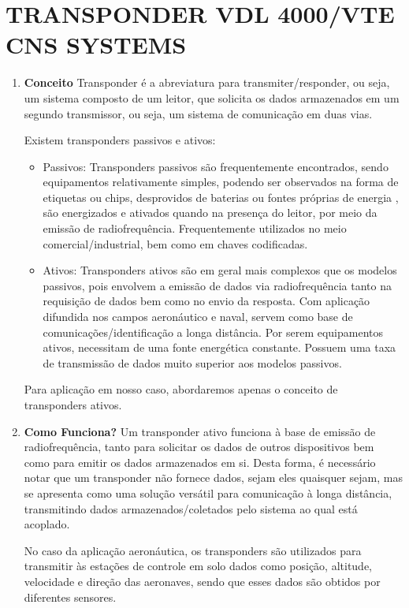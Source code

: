 \chapter[TRANSPONDER VDL 4000/VTE CNS SYSTEMS]{TRANSPONDER VDL 4000/VTE CNS SYSTEMS}

\begin{enumerate}
\item \textbf{Conceito}
Transponder é a abreviatura para transmiter/responder, ou seja, um sistema
composto de um leitor, que solicita os dados armazenados em um segundo
transmissor, ou seja, um sistema de comunicação em duas vias.

Existem transponders passivos e ativos:

\begin{itemize}
  \item Passivos: Transponders passivos são frequentemente encontrados,
  sendo equipamentos relativamente simples, podendo ser observados na forma
  de etiquetas ou chips, desprovidos de baterias ou fontes próprias de energia
  , são energizados e ativados quando na presença do leitor, por meio da
   emissão de radiofrequência. Frequentemente utilizados no meio
   comercial/industrial, bem como em chaves codificadas.
  \item Ativos: Transponders ativos são em geral mais complexos que os
  modelos passivos, pois envolvem a emissão de dados via radiofrequência
  tanto na requisição de dados bem como no envio da resposta. Com aplicação
  difundida nos campos aeronáutico e naval, servem como base de
  comunicações/identificação a longa distância. Por serem equipamentos ativos,
  necessitam de uma fonte energética constante. Possuem uma taxa de
  transmissão de dados muito superior aos modelos passivos.
\end{itemize}

Para aplicação em nosso caso, abordaremos apenas o conceito de transponders ativos.

\item \textbf{Como Funciona?}
Um transponder ativo funciona à base de emissão de radiofrequência, tanto para
solicitar os dados de outros dispositivos bem como para emitir os dados
armazenados em si. Desta forma, é necessário notar que um transponder não
fornece dados, sejam eles quaisquer sejam, mas se apresenta como uma solução
versátil para comunicação à longa distância, transmitindo dados
armazenados/coletados pelo sistema ao qual está acoplado.

No caso da aplicação aeronáutica, os transponders são utilizados para
transmitir às estações de controle em solo dados como posição, altitude,
velocidade e direção das aeronaves, sendo que esses dados são obtidos
por diferentes sensores.


\end{enumerate}
